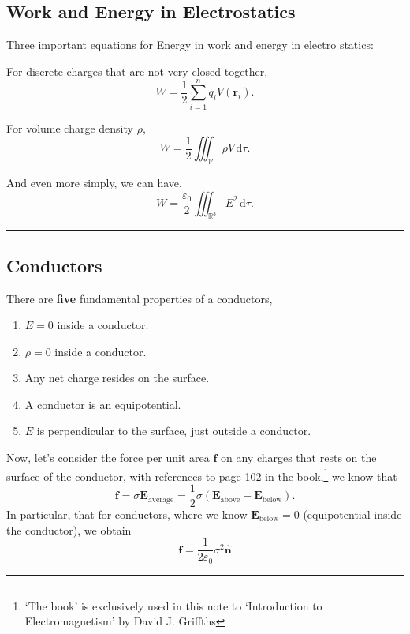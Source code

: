 \documentclass[12pt,english]{article}
\newcommand{\dmr}[1]{\, \mathrm{d}#1} %
\numberwithin{equation}{subsection}
\let\oldhat\hat
\renewcommand{\vec}[1]{\mathbf{#1}}
\renewcommand{\hat}[1]{\oldhat{\mathbf{#1}}}
\begin{document}
\subsection{Work and Energy in Electrostatics}
Three important equations for Energy in work and energy in electro statics:
\par For discrete charges that are not very closed together,
\begin{equation}
    W = \frac{1}{2} \sum_{i = 1}^{n}q_i V(\vec{r}_i).
\end{equation}
\par For volume charge density $\rho$, 
\begin{equation}
    W = \frac12 \iiint_{\mathcal{V}} \rho V \dmr{\tau}.
\end{equation}
\par And even more simply, we can have,
\begin{equation}
    W = \frac{\varepsilon_0}{2}\iiint_{\mathbb{R}^3}E^2\dmr{\tau}.
\end{equation}

\par\noindent\rule{\textwidth}{0.4pt}
\subsection{Conductors}
There are \textbf{five} fundamental properties of a conductors,
\begin{enumerate}
    \item $E = 0$ inside a conductor.
    \item $\rho = 0$ inside a conductor.
    \item Any net charge resides on the surface.
    \item A conductor is an equipotential.
    \item $E$ is perpendicular to the surface, just outside a conductor.
\end{enumerate}

Now, let's consider the force per unit area $\vec{f}$ on any charges that rests on the surface of the conductor, with references to page 102 in the book,\footnote{`The book' is exclusively used in this note to `Introduction to Electromagnetism' by David J. Griffths} we know that
\begin{equation}
    \vec{f} = \sigma \vec{E}_{\text{average}} = \frac12 \sigma (\vec{E}_{\text{above}}-\vec{E}_{\text{below}}).
\end{equation}
In particular, that for conductors, where we know $\vec{E}_{\text{below}} = 0$ (equipotential inside the conductor), we obtain 
\begin{equation}
    \vec{f} = \frac{1}{2\varepsilon_0}\sigma^2 \hat{n}
\end{equation} 
\par\noindent\rule{\textwidth}{0.4pt}
\end{document}
